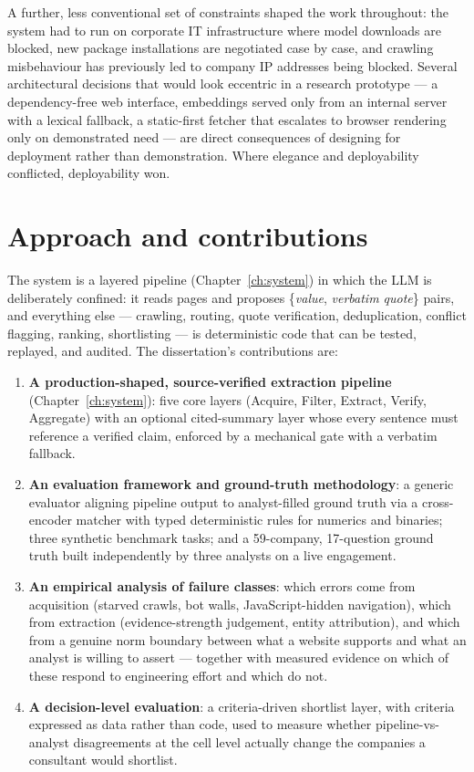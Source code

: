 \documentclass[11pt,a4paper]{report}
\begin{document}
A further, less conventional set of constraints shaped the work throughout:
the system had to run on corporate IT infrastructure where model downloads
are blocked, new package installations are negotiated case by case, and
crawling misbehaviour has previously led to company IP addresses being
blocked. Several architectural decisions that would look eccentric in a
research prototype --- a dependency-free web interface, embeddings served only
from an internal server with a lexical fallback, a static-first fetcher that
escalates to browser rendering only on demonstrated need --- are direct
consequences of designing for deployment rather than demonstration.
Where elegance and deployability conflicted, deployability won.

\section{Approach and contributions}

The system is a layered pipeline (Chapter~\ref{ch:system}) in which the LLM
is deliberately confined: it reads pages and proposes
\{\emph{value}, \emph{verbatim quote}\} pairs, and everything else ---
crawling, routing, quote verification, deduplication, conflict flagging,
ranking, shortlisting --- is deterministic code that can be tested, replayed,
and audited. The dissertation's contributions are:

\begin{enumerate}
  \item \textbf{A production-shaped, source-verified extraction pipeline}
    (Chapter~\ref{ch:system}): five core layers (Acquire, Filter, Extract,
    Verify, Aggregate) with an optional cited-summary layer whose every
    sentence must reference a verified claim, enforced by a mechanical gate
    with a verbatim fallback.
  \item \textbf{An evaluation framework and ground-truth methodology}:
    a generic evaluator aligning pipeline output to analyst-filled ground
    truth via a cross-encoder matcher with typed deterministic rules for
    numerics and binaries; three synthetic benchmark tasks; and a
    59-company, 17-question ground truth built independently by three
    analysts on a live engagement.
  \item \textbf{An empirical analysis of failure classes}: which errors come
    from acquisition (starved crawls, bot walls, JavaScript-hidden
    navigation), which from extraction (evidence-strength judgement,
    entity attribution), and which from a genuine norm boundary between
    what a website supports and what an analyst is willing to assert ---
    together with measured evidence on which of these respond to
    engineering effort and which do not.
  \item \textbf{A decision-level evaluation}: a criteria-driven shortlist
    layer, with criteria expressed as data rather than code, used to
    measure whether pipeline-vs-analyst disagreements at the cell level
    actually change the companies a consultant would shortlist.
\end{enumerate}
\end{document}
